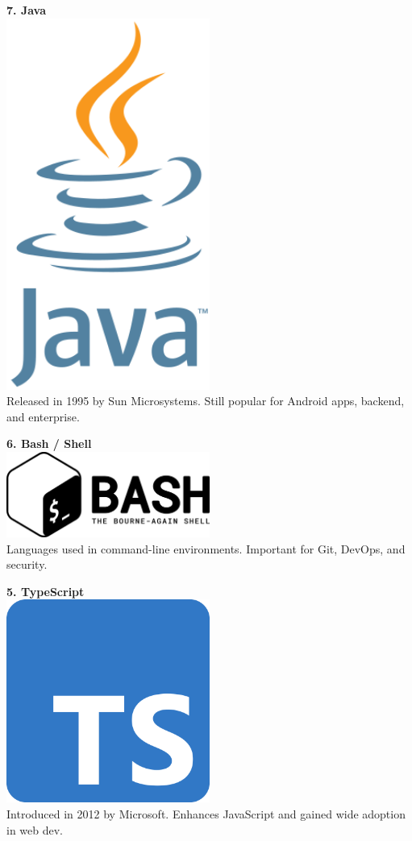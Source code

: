 \documentclass[12pt,a4paper]{article}
\begin{document}
\textbf{7. Java} \\
\includegraphics[width=0.5\textwidth]{images/java.png} \\
Released in 1995 by Sun Microsystems. Still popular for Android apps, backend, and enterprise.

\hrulefill

\textbf{6. Bash / Shell} \\
\includegraphics[width=0.5\textwidth]{images/bash.png} \\
Languages used in command-line environments. Important for Git, DevOps, and security.

\hrulefill

\textbf{5. TypeScript} \\
\includegraphics[width=0.5\textwidth]{images/ts.png} \\
Introduced in 2012 by Microsoft. Enhances JavaScript and gained wide adoption in web dev.
\end{document}

